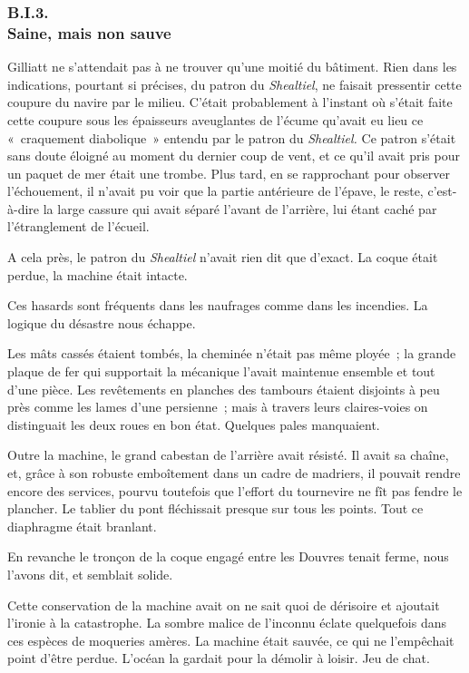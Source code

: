 \documentclass[french,twoside]{book} %
\begin{document}
 \subsubsection[{B.I.3. Saine, mais non sauve}]{B.I.3. \\
Saine, mais non sauve}
\noindent Gilliatt ne s’attendait pas à ne trouver qu’une moitié du bâtiment. Rien dans les indications, pourtant si précises, du patron du \emph{Shealtiel}, ne faisait pressentir cette coupure du navire par le milieu. C’était probablement à l’instant où s’était faite cette coupure sous les épaisseurs aveuglantes de l’écume qu’avait eu lieu ce « craquement diabolique » entendu par le patron du \emph{Shealtiel.} Ce patron s’était sans doute éloigné au moment du dernier coup de vent, et ce qu’il avait pris pour un paquet de mer était une trombe. Plus tard, en se rapprochant pour observer l’échouement, il n’avait pu voir que la partie antérieure de l’épave, le reste, c’est-à-dire la large cassure qui avait séparé l’avant de l’arrière, lui étant caché par l’étranglement de l’écueil.\par
A cela près, le patron du \emph{Shealtiel} n’avait rien dit que d’exact. La coque était perdue, la machine était intacte.\par
Ces hasards sont fréquents dans les naufrages  comme dans les incendies. La logique du désastre nous échappe.\par
Les mâts cassés étaient tombés, la cheminée n’était pas même ployée ; la grande plaque de fer qui supportait la mécanique l’avait maintenue ensemble et tout d’une pièce. Les revêtements en planches des tambours étaient disjoints à peu près comme les lames d’une persienne ; mais à travers leurs claires-voies on distinguait les deux roues en bon état. Quelques pales manquaient.\par
Outre la machine, le grand cabestan de l’arrière avait résisté. Il avait sa chaîne, et, grâce à son robuste emboîtement dans un cadre de madriers, il pouvait rendre encore des services, pourvu toutefois que l’effort du tournevire ne fît pas fendre le plancher. Le tablier du pont fléchissait presque sur tous les points. Tout ce diaphragme était branlant.\par
En revanche le tronçon de la coque engagé entre les Douvres tenait ferme, nous l’avons dit, et semblait solide.\par
Cette conservation de la machine avait on ne sait quoi de dérisoire et ajoutait l’ironie à la catastrophe. La sombre malice de l’inconnu éclate quelquefois dans ces espèces de moqueries amères. La machine était sauvée, ce qui ne l’empêchait point d’être perdue. L’océan la gardait pour la démolir à loisir. Jeu de chat.\par
\end{document}
